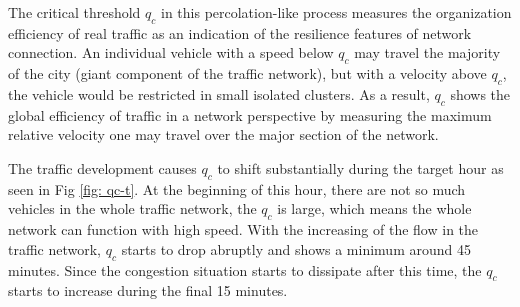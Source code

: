 The critical threshold $q_c$ in this percolation-like process measures the organization efficiency of real traffic as an indication of the resilience features of network connection. An individual vehicle with a speed below $q_c$ may travel the majority of the city (giant component of the traffic network), but with a velocity above $q_c$, the vehicle would be restricted in small isolated clusters. As a result, $q_c$ shows the global efficiency of traffic in a network perspective by measuring the maximum relative velocity one may travel over the major section of the network.

The traffic development causes $q_c$ to shift substantially during the target hour as seen in Fig \ref{fig: qc-t}. At the beginning of this hour, there are not so much vehicles in the whole traffic network, the $q_c$ is large, which means the whole network can function with high speed. With the increasing of the flow in the traffic network, $q_c$ starts to drop abruptly and shows a minimum around 45 minutes. Since the congestion situation starts to dissipate after this time, the $q_c$ starts to increase during the final 15 minutes.

